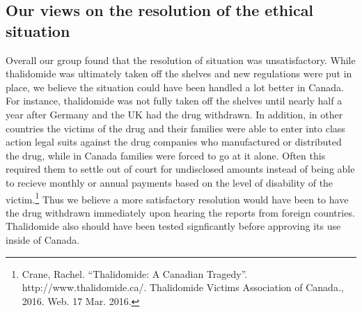 \documentclass[8pt]{article}
\newcommand{\q}[1]{``#1''}
\begin{document}
\subsection{Our views on the resolution of the ethical situation}
Overall our group found that the resolution of situation was unsatisfactory. While thalidomide was ultimately taken off the shelves and new regulations were put in place, we believe the situation could have been handled a lot better in Canada. For instance, thalidomide was not fully taken off the shelves until nearly half a year after Germany and the UK had the drug withdrawn. In addition, in other countries the victims of the drug and their families were able to enter into class action legal suits against the drug companies who manufactured or distributed the drug, while in Canada families were forced to go at it alone. Often this required them to settle out of court for undisclosed amounts instead of being able to recieve monthly or annual payments based on the level of disability of the victim.\footnote{Crane, Rachel. \q{Thalidomide: A Canadian Tragedy}. http://www.thalidomide.ca/. Thalidomide Victims Association of Canada., 2016. Web. 17 Mar. 2016.} Thus we believe a more satisfactory resolution would have been to have the drug withdrawn immediately upon hearing the reports from foreign countries. Thalidomide also should have been tested signficantly before approving its use inside of Canada.
\end{document}
